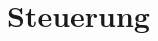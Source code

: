 \section{Steuerung}
\SecAuth{\nameJS}

\newpage
\SecAuth{\nameSH}

\newpage 

\newpage
\SecAuth{\nameCZ}

